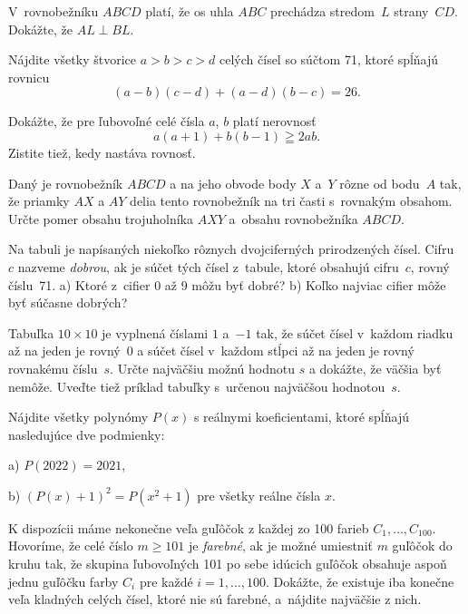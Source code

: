 {%
V~rovnobežníku $ABCD$ platí, že os uhla $ABC$ prechádza stredom~$L$ strany~$CD$. Dokážte, že $AL\perp BL$.}

{%
Nájdite všetky štvorice $a>b>c>d$ celých čísel so súčtom 71,
ktoré spĺňajú rovnicu
$$
(a-b)(c-d)+(a-d)(b-c)=26.
$$
}

{%
Dokážte, že pre ľubovoľné celé čísla $a$, $b$ platí nerovnosť
$$
a(a+1)+b(b-1)\geqq2ab.
$$
Zistite tiež, kedy nastáva rovnosť.}

{%
Daný je rovnobežník $ABCD$ a na jeho obvode body $X$ a~$Y$ rôzne
od bodu~$A$ tak, že priamky $AX$ a $AY$ delia tento rovnobežník na
tri časti s~rovnakým obsahom. Určte pomer obsahu trojuholníka $AXY$ a~obsahu rovnobežníka $ABCD$.}

{%
Na tabuli je napísaných niekoľko rôznych dvojciferných prirodzených čísel.
Cifru~$c$ nazveme {\it dobrou}, ak je súčet tých čísel
z~tabule, ktoré obsahujú cifru~$c$, rovný číslu~71.
\ite a) Ktoré z~cifier 0 až 9 môžu byť dobré?
\ite b) Koľko najviac cifier môže byť súčasne dobrých?}

{%
Tabuľka $10\times 10$ je vyplnená číslami $1$ a~${-1}$ tak, že súčet čísel
v~každom riadku až na jeden je rovný~0 a súčet čísel v~každom stĺpci až
na jeden je rovný rovnakému číslu~$s$. Určte najväčšiu možnú
hodnotu $s$ a dokážte, že väčšia byť nemôže. Uveďte tiež príklad tabuľky
s~určenou najväčšou hodnotou~$s$.}

{%

Nájdite všetky polynómy $P(x)$ s reálnymi koeficientami, ktoré spĺňajú nasledujúce dve podmienky:
\item{a)} $P(2022)=2021$,
\item{b)} $(P(x)+1)^2=P(x^2+1)$ pre všetky reálne čísla $x$.
}

{%

K dispozícii máme nekonečne veľa guľôčok z každej zo 100 farieb $C_1,\dots,C_{100}$. Hovoríme, že celé číslo $m\ge 101$ je {\it farebné}, ak je možné umiestniť $m$ guľôčok do kruhu tak, že skupina ľubovoľných 101 po sebe idúcich guľôčok obsahuje aspoň jednu guľôčku farby $C_i$ pre každé $i=1,\dots,100$. Dokážte, že existuje iba konečne veľa kladných celých čísel, ktoré nie sú farebné, a~nájdite najväčšie z nich.}

